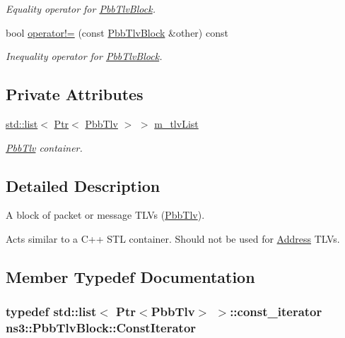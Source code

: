 \begin{DoxyCompactItemize}
\begin{DoxyCompactList}\small\item\em Equality operator for \hyperlink{classns3_1_1PbbTlvBlock}{Pbb\+Tlv\+Block}. \end{DoxyCompactList}\item 
bool \hyperlink{classns3_1_1PbbTlvBlock_ac13e968ed7f86b3b50945bbcd318a3b9}{operator!=} (const \hyperlink{classns3_1_1PbbTlvBlock}{Pbb\+Tlv\+Block} \&other) const 
\begin{DoxyCompactList}\small\item\em Inequality operator for \hyperlink{classns3_1_1PbbTlvBlock}{Pbb\+Tlv\+Block}. \end{DoxyCompactList}\end{DoxyCompactItemize}
\subsection*{Private Attributes}
\begin{DoxyCompactItemize}
\item 
\hyperlink{openflow-interface_8h_afd9bcfa176617760671b67580f536fa7}{std\+::list}$<$ \hyperlink{classns3_1_1Ptr}{Ptr}$<$ \hyperlink{classns3_1_1PbbTlv}{Pbb\+Tlv} $>$ $>$ \hyperlink{classns3_1_1PbbTlvBlock_a044b9b8113c50e42e87e712abe9b0c20}{m\+\_\+tlv\+List}
\begin{DoxyCompactList}\small\item\em \hyperlink{classns3_1_1PbbTlv}{Pbb\+Tlv} container. \end{DoxyCompactList}\end{DoxyCompactItemize}


\subsection{Detailed Description}
A block of packet or message T\+L\+Vs (\hyperlink{classns3_1_1PbbTlv}{Pbb\+Tlv}). 

Acts similar to a C++ S\+TL container. Should not be used for \hyperlink{classns3_1_1Address}{Address} T\+L\+Vs. 

\subsection{Member Typedef Documentation}
\subsubsection[{\texorpdfstring{Const\+Iterator}{ConstIterator}}]{\setlength{\rightskip}{0pt plus 5cm}typedef {\bf std\+::list}$<$ {\bf Ptr}$<${\bf Pbb\+Tlv}$>$ $>$\+::const\+\_\+iterator {\bf ns3\+::\+Pbb\+Tlv\+Block\+::\+Const\+Iterator}}\hypertarget{classns3_1_1PbbTlvBlock_a069f89bd3bb058e9fa72ea464854c01f}{}\label{classns3_1_1PbbTlvBlock_a069f89bd3bb058e9fa72ea464854c01f}


